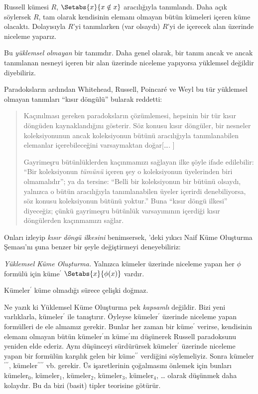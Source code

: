 



Russell kümesi $R$, $\Setabs{x}{x\notin x}$ aracılığıyla tanımlandı. Daha
açık söylersek $R$, tam olarak kendisinin elemanı olmayan bütün kümeleri
içeren küme olacaktı. Dolayısıyla $R$'yi tanımlarken (var olsaydı) $R$'yi de
içerecek alan üzerinde niceleme yaparız.

Bu \emph{yüklemsel olmayan} bir tanımdır. Daha genel olarak, bir tanım ancak
ve ancak tanımlanan nesneyi içeren bir alan üzerinde niceleme yapıyorsa
yüklemsel değildir diyebiliriz.

Paradoksların ardından Whitehead, Russell, Poincar\'{e} ve Weyl bu tür
yüklemsel olmayan tanımları ``kısır döngülü'' bularak reddetti:
\begin{quote}
  Kaçınılması gereken paradoksların çözümlemesi, hepsinin bir tür kısır
  döngüden kaynaklandığını gösterir. Söz konusu kısır döngüler, bir nesneler
  koleksiyonunun ancak koleksiyonun bütünü aracılığıyla tanımlanabilen
  elemanlar içerebileceğini varsaymaktan doğar[\ldots. \textparagraph]

  Gayrimeşru bütünlüklerden kaçınmamızı sağlayan ilke şöyle ifade edilebilir:
  ``Bir koleksiyonun \emph{tümünü} içeren şey o koleksiyonun üyelerinden biri
  olmamalıdır''; ya da tersine: ``Belli bir koleksiyonun bir bütünü olsaydı,
  yalnızca o bütün aracılığıyla tanımlanabilen üyeler içerirdi denebiliyorsa,
  söz konusu koleksiyonun bütünü yoktur.'' Buna ``kısır döngü ilkesi''
  diyeceğiz; çünkü gayrimeşru bütünlük varsayımının içerdiği kısır
  döngülerden kaçınmamızı sağlar. \citep[p.~37]{WhiteheadRussell1910}
\end{quote}
Onları izleyip \emph{kısır döngü ilkesini} benimsersek,
'deki yıkıcı Naif Küme Oluşturma Şeması'nı
şuna benzer bir şeyle değiştirmeyi deneyebiliriz:

\begin{defish}
\emph{Yüklemsel Küme Oluşturma.} Yalnızca kümeler üzerinde niceleme yapan
her $\phi$ formülü için küme$^\prime$ $\Setabs{x}{\phi(x)}$ vardır.
\end{defish}

Kümeler$^{\prime}$ küme olmadığı sürece çelişki doğmaz.

Ne yazık ki Yüklemsel Küme Oluşturma pek \emph{kapsamlı} değildir. Bizi yeni
varlıklarla, kümeler$^\prime$ ile tanıştırır. Öyleyse kümeler$^\prime$
üzerinde niceleme yapan formülleri de ele almamız gerekir. Bunlar her zaman
bir küme$^\prime$ verirse, kendisinin elemanı olmayan bütün
kümeler$^\prime$ın küme$^\prime$ını düşünerek Russell paradoksunu yeniden
elde ederiz. Aynı düşünceyi sürdürürsek kümeler$^\prime$ üzerinde niceleme
yapan bir formülün karşılık gelen bir küme$^{\prime\prime}$ verdiğini
söylemeliyiz. Sonra kümeler$^{\prime\prime\prime}$,
kümeler$^{\prime\prime\prime\prime}$ vb. gerekir. Üs işaretlerinin
çoğalmasını önlemek için bunları kümeler$_0$, kümeler$_1$, kümeler$_2$,
kümeler$_3$, kümeler$_4$, \ldots{} olarak düşünmek daha kolaydır. Bu da bizi
(basit) tipler teorisine götürür.


